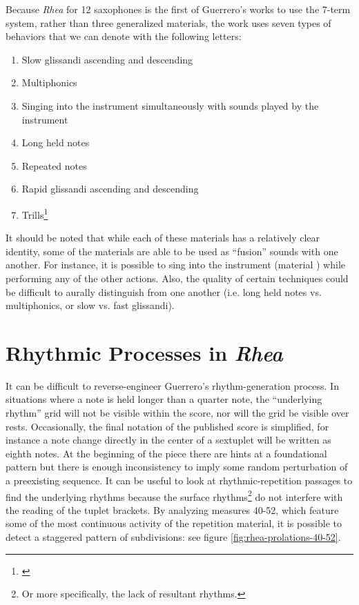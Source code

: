 Because \textit{Rhea} for 12 saxophones is the first of Guerrero's works to use the 7-term system, rather than three generalized materials, the work uses seven types of behaviors that we can denote with the following letters:
\begin{enumerate}[label=\Alph*]
\item Slow glissandi ascending and descending
\item Multiphonics
\item Singing into the instrument simultaneously with sounds played by the instrument
\item Long held notes
\item Repeated notes
\item Rapid glissandi ascending and descending
\item Trills\footnote{\citet[285]{guerreropaper}}
\end{enumerate}
It should be noted that while each of these materials has a relatively clear identity, some of the materials are able to be used as ``fusion'' sounds with one another. For instance, it is possible to sing into the instrument (material ) while performing any of the other actions. Also, the quality of certain techniques could be difficult to aurally distinguish from one another (i.e. long held notes vs. multiphonics, or slow vs. fast glissandi).

\section{Rhythmic Processes in \textit{Rhea}}

It can be difficult to reverse-engineer Guerrero's rhythm-generation process. In situations where a note is held longer than a quarter note, the ``underlying rhythm'' grid will not be visible within the score, nor will the grid be visible over rests. Occasionally, the final notation of the published score is simplified, for instance a note change directly in the center of a sextuplet will be written as eighth notes. At the beginning of the piece there are hints at a foundational pattern but there is enough inconsistency to imply some random perturbation of a preexisting sequence. It can be useful to look at rhythmic-repetition passages to find the underlying rhythms because the surface rhythms\footnote{Or more specifically, the lack of resultant rhythms.} do not interfere with the reading of the tuplet brackets. By analyzing measures 40-52, which feature some of the most continuous activity of the repetition material, it is possible to detect a staggered pattern of subdivisions: see figure \ref{fig:rhea-prolations-40-52}.

